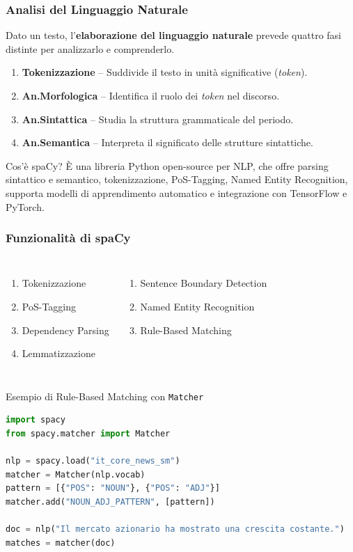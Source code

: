 \documentclass{beamer}
\begin{document}
\begin{frame}
\frametitle{Analisi del Linguaggio Naturale}

Dato un testo, l’\textbf{elaborazione del linguaggio naturale} prevede quattro fasi distinte per analizzarlo e comprenderlo.

\vspace{0.25cm}
\begin{enumerate}
\item \textbf{Tokenizzazione} -- Suddivide il testo in unità significative (\textit{token}).
\item \textbf{An.Morfologica} -- Identifica il ruolo dei \textit{token} nel discorso.
\item \textbf{An.Sintattica} -- Studia la struttura grammaticale del periodo.
\item \textbf{An.Semantica} -- Interpreta il significato delle strutture sintattiche.
\end{enumerate}

\begin{block}{Cos'è spaCy?}
È una libreria Python open-source per NLP, che offre parsing sintattico e semantico, tokenizzazione, PoS-Tagging, Named Entity Recognition, supporta modelli di apprendimento automatico e integrazione con TensorFlow e PyTorch.
\end{block}
\end{frame}


\begin{frame}[fragile]
\frametitle{Funzionalità di spaCy}

\begin{columns}
\begin{enumerate}
\item Tokenizzazione
\item PoS-Tagging
\item Dependency Parsing
\item Lemmatizzazione
\end{enumerate}
\begin{enumerate}
\item Sentence Boundary Detection
\item Named Entity Recognition
\item Rule-Based Matching
\end{enumerate}
\end{columns}

\vspace{0.25cm}
\begin{block}{Esempio di Rule-Based Matching con \texttt{Matcher}}
\begin{lstlisting}[language=Python]
import spacy
from spacy.matcher import Matcher

nlp = spacy.load("it_core_news_sm")
matcher = Matcher(nlp.vocab)
pattern = [{"POS": "NOUN"}, {"POS": "ADJ"}]
matcher.add("NOUN_ADJ_PATTERN", [pattern])

doc = nlp("Il mercato azionario ha mostrato una crescita costante.")
matches = matcher(doc)
\end{lstlisting}
\end{block}
\end{frame}
\end{document}
